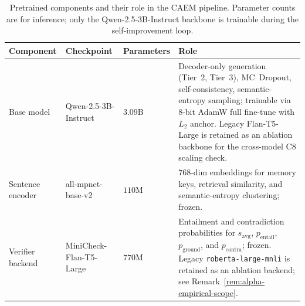 \begin{table}[htbp]
\centering
\small
\caption{Pretrained components and their role in the CAEM pipeline. Parameter counts are for inference; only the Qwen-2.5-3B-Instruct backbone is trainable during the self-improvement loop.}
\label{tab:pretrained-components}
\begin{tabular}{@{}p{3.4cm}p{2.2cm}p{2.0cm}p{5.0cm}@{}}
\toprule
\textbf{Component} & \textbf{Checkpoint} & \textbf{Parameters} & \textbf{Role} \\
\midrule
Base model & Qwen-2.5-3B-Instruct~\citep{qwen25} & $3.09$B & Decoder-only generation (Tier~2, Tier~3), MC~Dropout, self-consistency, semantic-entropy sampling; trainable via 8-bit AdamW full fine-tune with $L_{2}$ anchor. Legacy Flan-T5-Large \citep{JMLR:v25:23-0870} is retained as an ablation backbone for the cross-model C8 scaling check. \\
Sentence encoder & all-mpnet-base-v2 \citep{reimers-gurevych-2019-sentence} & $110$M & $768$-dim embeddings for memory keys, retrieval similarity, and semantic-entropy clustering; frozen. \\
Verifier backend & MiniCheck-Flan-T5-Large \citep{tang2024minicheck} & $770$M & Entailment and contradiction probabilities for $s_{\mathrm{avg}}$, $p_{\mathrm{entail}}$, $p_{\mathrm{ground}}$, and $p_{\mathrm{contra}}$; frozen. Legacy \texttt{roberta-large-mnli} \citep{liu2019roberta} is retained as an ablation backend; see Remark~\ref{rem:alpha-empirical-scope}. \\
\bottomrule
\end{tabular}
\end{table}

